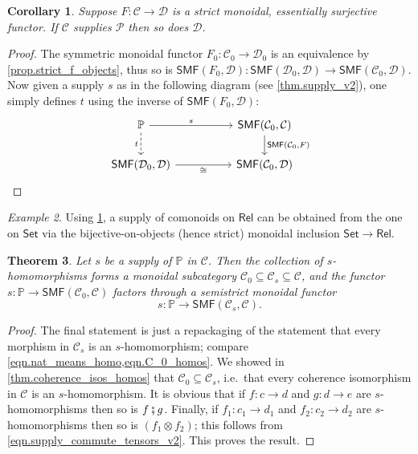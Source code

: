 \documentclass[11pt, oneside, article]{memoir}
\theoremstyle{plain}
\newtheorem{theorem}{Theorem}[chapter]
\newtheorem{corollary}[theorem]{Corollary}
\theoremstyle{definition}
\theoremstyle{remark}
\newtheorem{example}[theorem]{Example}
\newcommand{\cat}[1]{\mathcal{#1}}%
\newcommand{\Cat}[1]{{\mathsf{#1}}}%
\newcommand{\smset}{\Cat{Set}}
\newcommand{\smf}{\Cat{SMF}}
\newcommand{\pp}{\mathbb{P}}
\newcommand{\mob}[1]{#1_0}
\newcommand{\rel}{\Cat{Rel}}
\newcommand{\cp}{\mathbin{\fatsemi}}
\renewcommand{\ss}{\subseteq}
\begin{document}
\begin{corollary}\label{cor.strong_bo}
Suppose $F\colon\cat{C}\to\cat{D}$ is a strict monoidal, essentially surjective functor. If $\cat{C}$ supplies $\cat{P}$ then so does $\cat{D}$.
\end{corollary}
\begin{proof}
The symmetric monoidal functor $\mob{F}\colon\mob{\cat{C}}\to\mob{\cat{D}}$ is an equivalence by \cref{prop.strict_f_objects}, thus so is $\smf(\mob{F},\cat{D})\colon\smf(\mob{\cat{D}},\cat{D})\to\smf(\mob{\cat{C}},\cat{D})$. Now given a supply $s$ as in the following diagram (see \cref{thm.supply_v2}), one simply defines $t$ using the inverse of $\smf(\mob{F},\cat{D})$:
\[
\begin{tikzcd}[column sep=50pt]
	\pp\ar[r, "s"]\ar[d, dashed, "t"']&
	\smf(\mob{\cat{C}},\cat{C})\ar[d, "{\smf(\mob{\cat{C}},F)}"]\\
	\smf(\mob{\cat{D}},\cat{D})\ar[r, "\cong"']&
	\smf(\mob{\cat{C}},\cat{D})
\end{tikzcd}
\qedhere
\]
\end{proof}

\begin{example}
Using \cref{cor.strong_bo}, a supply of comonoids on $\rel$ can be obtained from the one on $\smset$ via the bijective-on-objects (hence strict) monoidal inclusion $\smset\to\rel$.
\end{example}

\begin{theorem}\label{thm.homos_form_subcat}
Let $s$ be a supply of $\pp$ in $\cat{C}$. Then the collection of $s$-homomorphisms forms a monoidal subcategory $\mob{\cat{C}}\ss\cat{C}_s\ss\cat{C}$, and the functor $s\colon\pp\to\smf(\mob{\cat{C}},\cat{C})$ factors through a semistrict monoidal functor
\[s\colon\pp\to\smf(\cat{C}_s,\cat{C}).\]
\end{theorem}
\begin{proof}
The final statement is just a repackaging of the statement that every morphism in $\cat{C}_s$ is an $s$-homomorphism; compare \cref{eqn.nat_means_homo,eqn.C_0_homos}. We showed in \cref{thm.coherence_isos_homos} that $\mob{\cat{C}}\ss\cat{C}_s$, i.e.\ that every coherence isomorphism in $\cat{C}$ is an $s$-homomorphism. It is obvious that if $f\colon c\to d$ and $g\colon d\to e$ are $s$-homomorphisms then so is $f\cp g$. Finally, if $f_1\colon c_1\to d_1$ and $f_2\colon c_2\to d_2$ are $s$-homomorphisms then so is $(f_1\otimes f_2)$; this follows from \cref{eqn.supply_commute_tensors_v2}. This proves the result.
\end{proof}
\end{document}
